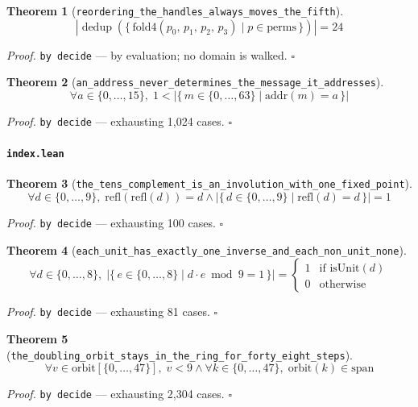 \documentclass[11pt]{article}
\newtheorem{theorem}{Theorem}[section]
\begin{document}
\begin{theorem}[\texttt{reordering\_the\_handles\_always\_moves\_the\_fifth}]
\[ \left|\operatorname{dedup}\left(\{\, \mathrm{fold4}\mathopen{}\left(p_{0},\,p_{1},\,p_{2},\,p_{3}\right) \mid p \in \mathrm{perms} \,\}\right)\right| = 24 \]
\end{theorem}
\noindent\emph{Proof.} \texttt{by decide} --- by evaluation; no domain is walked. \hfill$\square$

\begin{theorem}[\texttt{an\_address\_never\_determines\_the\_message\_it\_addresses}]
\[ \forall a \in \{0,\dots,15\},\; 1 < \left|\{\, m \in \{0,\dots,63\} \mid \mathrm{addr}\mathopen{}\left(m\right) = a \,\}\right| \]
\end{theorem}
\noindent\emph{Proof.} \texttt{by decide} --- exhausting 1,024 cases. \hfill$\square$

\paragraph{\texttt{index.lean}}

\begin{theorem}[\texttt{the\_tens\_complement\_is\_an\_involution\_with\_one\_fixed\_point}]
\[ \forall d \in \{0,\dots,9\},\; \mathrm{refl}\mathopen{}\left(\mathrm{refl}\mathopen{}\left(d\right)\right) = d \land \left|\{\, d \in \{0,\dots,9\} \mid \mathrm{refl}\mathopen{}\left(d\right) = d \,\}\right| = 1 \]
\end{theorem}
\noindent\emph{Proof.} \texttt{by decide} --- exhausting 100 cases. \hfill$\square$

\begin{theorem}[\texttt{each\_unit\_has\_exactly\_one\_inverse\_and\_each\_non\_unit\_none}]
\[ \forall d \in \{0,\dots,8\},\; \left|\{\, e \in \{0,\dots,8\} \mid d \cdot e \bmod 9 = 1 \,\}\right| = \begin{cases}1 & \text{if } \mathrm{isUnit}\mathopen{}\left(d\right)\\ 0 & \text{otherwise}\end{cases} \]
\end{theorem}
\noindent\emph{Proof.} \texttt{by decide} --- exhausting 81 cases. \hfill$\square$

\begin{theorem}[\texttt{the\_doubling\_orbit\_stays\_in\_the\_ring\_for\_forty\_eight\_steps}]
\[ \forall v \in \mathrm{orbit}[\{0,\dots,47\}],\; v < 9 \land \forall k \in \{0,\dots,47\},\; \mathrm{orbit}\mathopen{}\left(k\right) \in \mathrm{span} \]
\end{theorem}
\noindent\emph{Proof.} \texttt{by decide} --- exhausting 2,304 cases. \hfill$\square$
\end{document}

